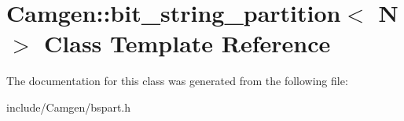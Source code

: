 \hypertarget{a00023}{}\section{Camgen\+:\+:bit\+\_\+string\+\_\+partition$<$ N $>$ Class Template Reference}
\label{a00023}


The documentation for this class was generated from the following file\+:\begin{DoxyCompactItemize}
\item 
include/\+Camgen/bspart.\+h\end{DoxyCompactItemize}
